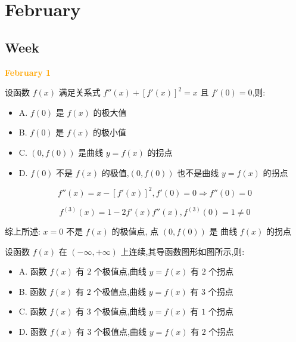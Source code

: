 \chapter{February}
\section{Week }
\textcolor{orange}{\textbf{February 1}}

\begin{example}[][Exam: 28.1.1]
	设函数 $f(x)$ 满足关系式 $f''(x)+[f'(x)]^{2}=x$ 且 $f'(0)=0$,则:
\begin{itemize}
	\item A. $f(0)$ 是 $f(x)$ 的极大值
	\item B. $f(0)$ 是 $f(x)$ 的极小值
	\item C. $(0,f(0))$ 是曲线 $y=f(x)$ 的拐点
	\item D. $f(0)$ 不是 $f(x)$ 的极值,$(0,f(0))$ 也不是曲线 $y=f(x)$ 的拐点
\end{itemize}
\end{example}

\begin{solution}

	$$f''(x) = x - [f'(x)]^{2}, f'(0) = 0\Rightarrow f''(0) = 0$$
	
	$$f^{(3)}(x) = 1 - 2f'(x)f''(x), f^{(3)}(0) = 1\neq 0$$

	综上所述: $x=0$ 不是 $f(x)$ 的极值点, 点 $(0,f(0))$ 是 曲线 $f(x)$ 的拐点
\end{solution}
\begin{example}[][Exam: 28.1.2]
	设函数 $f(x)$ 在 $(-\infty,+\infty)$ 上连续,其导函数图形如图所示,则:
\begin{itemize}
	\item A. 函数 $f(x)$ 有 $2$ 个极值点,曲线 $y=f(x)$ 有 $2$ 个拐点
	\item B. 函数 $f(x)$ 有 $2$ 个极值点,曲线 $y=f(x)$ 有 $3$ 个拐点
	\item C. 函数 $f(x)$ 有 $3$ 个极值点,曲线 $y=f(x)$ 有 $1$ 个拐点
	\item D. 函数 $f(x)$ 有 $3$ 个极值点,曲线 $y=f(x)$ 有 $2$ 个拐点
\end{itemize}
\end{example}

